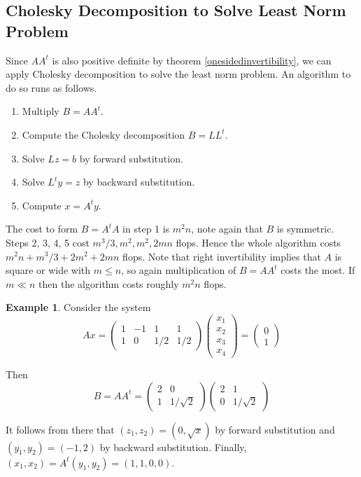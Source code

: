 \documentclass[12pt]{amsart}
\theoremstyle{definition}
\newtheorem{example}[theorem]{Example}
\begin{document}
\subsection{Cholesky Decomposition to Solve Least Norm Problem} Since $AA^t$ is also positive definite by theorem \ref{onesidedinvertibility}, we can apply Cholesky decomposition to solve the least norm problem. An algorithm to do so runs as follows.
\begin{enumerate}[\indent 1.]
\item Multiply $B = AA^t$.
\item Compute the Cholesky decomposition $B = LL^t$.
\item Solve $Lz = b$ by forward substitution.
\item Solve $L^t y = z$ by backward substitution.
\item Compute $x = A^ty$.
\end{enumerate}

The cost to form $B = A^tA$ in step 1 is $m^2n$, note again that $B$ is symmetric. Steps 2, 3, 4, 5 cost $m^3/3, m^2, m^2, 2mn$ flops. Hence the whole algorithm costs $m^2n + m^3/3 + 2m^2 + 2mn$ flops. Note that right invertibility implies that $A$ is square or wide with $m \leq n$, so again multiplication of $B = AA^t$ costs the most. If $m \ll n$ then the algorithm costs roughly $m^2n$ flops.

\begin{example}\label{leastsnormproblemCholeskydecompositionexample} Consider the system
$$Ax = \left(\begin{array}{cccc} 1 & -1 & 1 & 1 \\ 1 & 0 & 1/2 & 1/2 \end{array} \right)\left(\begin{array}{c} x_1 \\ x_2 \\ x_3 \\ x_4 \end{array}\right) = \left(\begin{array}{c} 0 \\ 1\end{array}\right)$$

Then
$$B = AA^t = \left(\begin{array}{cc} 2 & 0 \\ 1 & 1/ \sqrt{2} \end{array}\right) \left(\begin{array}{cc} 2 & 1 \\ 0 & 1/ \sqrt{2} \end{array}\right)$$

It follows from there that $(z_1, z_2) = (0, \sqrt{x})$ by forward substitution and $(y_1, y_2) = (-1,2)$ by backward substitution. Finally, $(x_1, x_2) = A^t(y_1, y_2) = (1,1,0,0)$.
\end{example}
\end{document}
